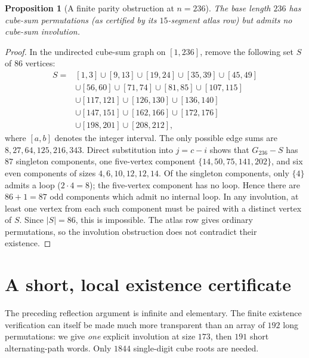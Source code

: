 \documentclass[10pt]{article}
\newtheorem{proposition}{Proposition}
\begin{document}
\begin{proposition}[A finite parity obstruction at $n=236$]
\label{prop:236-no-involution-elementary}
The base length $236$ has cube-sum
permutations (as certified by its
$15$-segment atlas row) but admits
no cube-sum \emph{involution}.
\end{proposition}
\begin{proof}
In the undirected cube-sum graph
on $[1,236]$, remove the following
set $S$ of $86$ vertices:
\[
\begin{aligned}
S={}&[1,3]\cup[9,13]\cup[19,24]
\cup[35,39]\cup[45,49]\\
&\cup[56,60]\cup[71,74]\cup[81,85]
\cup[107,115]\\
&\cup[117,121]\cup[126,130]
\cup[136,140]\\
&\cup[147,151]\cup[162,166]
\cup[172,176]\\
&\cup[198,201]\cup[208,212],
\end{aligned}
\]
where $[a,b]$ denotes the
integer interval.
The only possible edge sums are
$8,27,64,125,216,343$.
Direct substitution into
$j=c-i$ shows that $G_{236}-S$
has $87$ singleton components,
one five-vertex component
$\{14,50,75,141,202\}$, and
six even components of sizes
$4,6,10,12,12,14$.
Of the singleton components,
only $\{4\}$ admits a loop
($2\cdot4=8$); the five-vertex
component has no loop.
Hence there are $86+1=87$
odd components which admit
no internal loop. In any
involution, at least one
vertex from each such component
must be paired with a distinct
vertex of $S$. Since $|S|=86$,
this is impossible.
The atlas row gives ordinary
permutations, so the involution
obstruction does not contradict
their existence.
\end{proof}

\section{A short, local existence certificate}\label{sec:words}
The preceding reflection argument is infinite and elementary.
The finite existence verification can itself be made much more
transparent than an array of $192$ long permutations:
we give \emph{one} explicit involution at size $173$,
then $191$ short alternating-path words.
Only $1844$ single-digit cube roots are needed.
\end{document}
